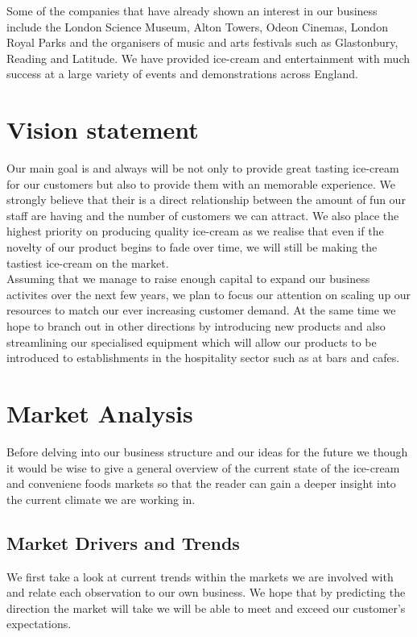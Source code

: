 \documentclass{article}
\begin{document}
Some of the companies that have already shown an interest in our business include the London Science Museum, Alton Towers, Odeon Cinemas, London Royal Parks and the organisers of music and arts festivals such as Glastonbury, Reading and Latitude. We have provided ice-cream and entertainment with much success at a large variety of events and demonstrations across England.


\section{Vision statement}

Our main goal is and always will be not only to provide great tasting ice-cream for our customers but also to provide them with an memorable experience. We strongly believe that their is a direct relationship between the amount of fun our staff are having and the number of customers we can attract. We also place the highest priority on producing quality ice-cream as we realise that even if the novelty of our product begins to fade over time, we will still be making the tastiest ice-cream on the market. \\


Assuming that we manage to raise enough capital to expand our business activites over the next few years, we plan to focus our attention on scaling up our resources to match our ever increasing customer demand. At the same time we hope to branch out in other directions by introducing new products and also streamlining our specialised equipment which will allow our products to be introduced to establishments in the hospitality sector such as at bars and cafes.

\section{Market Analysis}
  
  Before delving into our business structure and our ideas for the future we though it would be wise to give a general overview of the current state of the ice-cream and conveniene foods markets so that the reader can gain a deeper insight into the current climate we are working in.

  \subsection{Market Drivers and Trends}

   We first take a look at current trends within the markets we are involved with and relate each observation to our own business. We hope that by predicting the direction the market will take we will be able to meet and exceed our customer's expectations.
   
\end{document}
